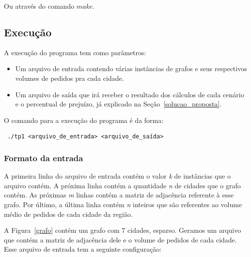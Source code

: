\documentclass[12pt]{article}
\begin{document}
Ou através do comando $make$.

\subsection{Execução}

A execução do programa tem como parâmetros:
\begin{itemize}
\item Um arquivo de entrada contendo várias instâncias de grafos e seus respectivos volumes de pedidos pra cada cidade.
\item Um arquivo de saída que irá receber o resultado dos cálculos de cada cenário e o percentual de prejuízo, já explicado na Seção~\ref{solucao_proposta}.
\end{itemize}

O comando para a execução do programa é da forma:

\begin{footnotesize}
\begin{verbatim} ./tp1 <arquivo_de_entrada> <arquivo_de_saída>\end{verbatim}
\end{footnotesize}

\subsubsection{Formato da entrada}

A primeira linha do arquivo de entrada contém o valor \textit{k} de instâncias que o arquivo contém. A próxima linha contém a quantidade \textit{n} de cidades que o grafo contém. As próximas \textit{m} linhas contém a matriz de adjacência referente à esse grafo. Por último, a última linha contém \textit{n} inteiros que são referentes ao volume médio de pedidos de cada cidade da região.

A Figura~\ref{grafo} contém um grafo com 7 cidades, esparso. Geramos um arquivo que contém a matriz de adjacência dele e o volume de pedidos de cada cidade. Esse arquivo de entrada tem a seguinte configuração:
\end{document}
